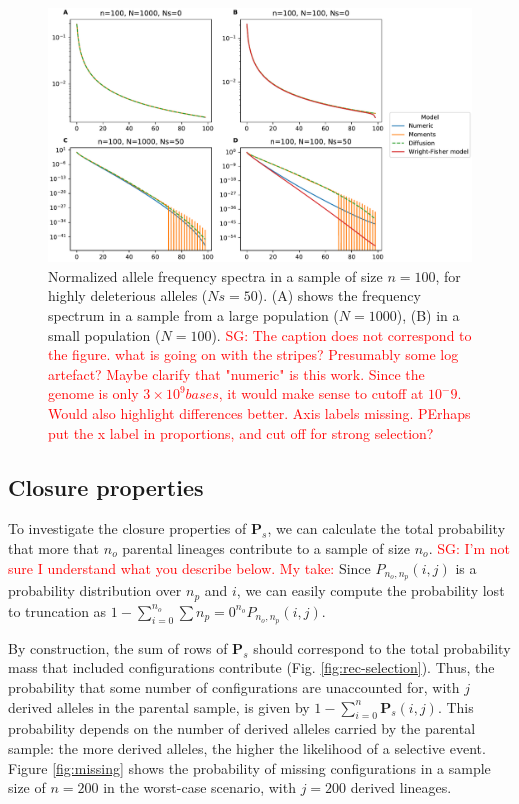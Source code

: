 \documentclass[review]{elsarticle}
\newcommand{\sgcomment}[1]{\textcolor{red}{SG: #1}}
\begin{document}
\begin{figure}
  \centering
  \includegraphics[width=0.7\textheight]{fig/strong_selection_four_panel.pdf}
  \caption{Normalized allele frequency spectra in a sample of size $n=100$, for highly deleterious
    alleles ($Ns=50$). (A) shows the frequency spectrum in a sample from a large population
    ($N=1000$), (B) in a small population ($N=100$). \sgcomment{The caption does not correspond to the figure.
    what is going on with the stripes? Presumably some log artefact? Maybe clarify that "numeric" is this work. Since the genome is only $3\times10^9 bases$, it would make sense to cutoff at $10^-9$. Would also highlight differences better. Axis labels missing. PErhaps put the x label in proportions, and cut off for strong selection?}
    \label{fig:strong-selection}
   }
 
\end{figure}


\subsection{Closure properties}
\label{subsec:closure}

To investigate the closure properties of $\mathbf{P}_s$, we can calculate the total probability that
more that $n_o$ parental lineages contribute to a sample of size $n_o$. \sgcomment{I'm not sure
 I understand what you describe below. My take:}
Since $P_{n_o,n_p}(i,j)$ is a probability distribution over $n_p$ and $i$, we can easily compute the probability lost to 
truncation as $1-\sum_{i=0}^{n_o} \sum{n_p=0}^{n_o}{P_{n_o,n_p}(i,j)}$. 


By construction, the sum
of rows of $\mathbf{P}_s$ should correspond to the total probability mass that included
configurations contribute (Fig. \ref{fig:rec-selection}). Thus, the probability that some number of
configurations are unaccounted for, with $j$ derived alleles in the parental sample, is given by
$1-\sum_{i=0}^{n}\mathbf{P}_s(i,j)$. This probability depends on the number of derived alleles
carried by the parental sample: the more derived alleles, the higher the likelihood of a selective
event. Figure \ref{fig:missing} shows the probability of missing configurations in a sample size of
$n=200$ in the worst-case scenario, with $j=200$ derived lineages.
\end{document}
